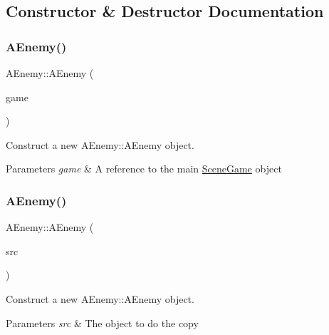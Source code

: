 \subsection{Constructor \& Destructor Documentation}
\mbox{\label{class_a_enemy_a951b8e4a3fbd53542740f8ba3f01b79d}} 
\subsubsection{\texorpdfstring{A\+Enemy()}{AEnemy()}\hspace{0.1cm}{\footnotesize\ttfamily [1/2]}}
{\footnotesize\ttfamily A\+Enemy\+::\+A\+Enemy (\begin{DoxyParamCaption}\item[{\hyperlink{class_scene_game}{Scene\+Game} \&}]{game }\end{DoxyParamCaption})\hspace{0.3cm}{\ttfamily [explicit]}}



Construct a new A\+Enemy\+::\+A\+Enemy object. 


\begin{DoxyParams}{Parameters}
{\em game} & A reference to the main \hyperlink{class_scene_game}{Scene\+Game} object \\
\hline
\end{DoxyParams}
\mbox{\label{class_a_enemy_add417acf741a28c3896fce4ffbad2e2a}} 
\subsubsection{\texorpdfstring{A\+Enemy()}{AEnemy()}\hspace{0.1cm}{\footnotesize\ttfamily [2/2]}}
{\footnotesize\ttfamily A\+Enemy\+::\+A\+Enemy (\begin{DoxyParamCaption}\item[{\hyperlink{class_a_enemy}{A\+Enemy} const \&}]{src }\end{DoxyParamCaption})}



Construct a new A\+Enemy\+::\+A\+Enemy object. 


\begin{DoxyParams}{Parameters}
{\em src} & The object to do the copy \\
\hline
\end{DoxyParams}


